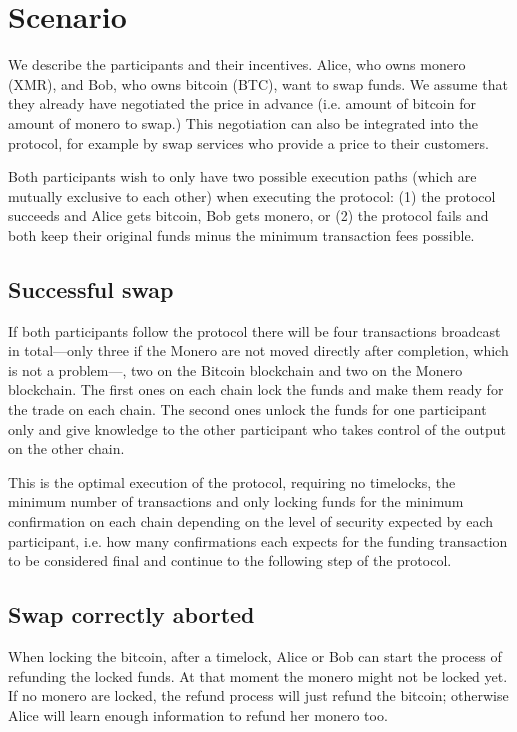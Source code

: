\documentclass{llncs}
\begin{document}
\section{Scenario}
We describe the participants and their incentives. Alice, who owns monero (XMR), and Bob, who owns bitcoin (BTC), want to swap funds. We assume that they already have negotiated the price in advance (i.e. amount of bitcoin for amount of monero to swap.) This negotiation can also be integrated into the protocol, for example by swap services who provide a price to their customers.

Both participants wish to only have two possible execution paths (which are mutually exclusive to each other) when executing the protocol: (1) the protocol succeeds and Alice gets bitcoin, Bob gets monero, or (2) the protocol fails and both keep their original funds minus the minimum transaction fees possible.

\subsection{Successful swap}
If both participants follow the protocol there will be four transactions broadcast in total---only three if the Monero are not moved directly after completion, which is not a problem---, two on the Bitcoin blockchain and two on the Monero blockchain. The first ones on each chain lock the funds and make them ready for the trade on each chain. The second ones unlock the funds for one participant only and give knowledge to the other participant who takes control of the output on the other chain.

This is the optimal execution of the protocol, requiring no timelocks, the minimum number of transactions and only locking funds for the minimum confirmation on each chain depending on the level of security expected by each participant, i.e. how many confirmations each expects for the funding transaction to be considered final and continue to the following step of the protocol.

\subsection{Swap correctly aborted}
When locking the bitcoin, after a timelock, Alice or Bob can start the process of refunding the locked funds. At that moment the monero might not be locked yet. If no monero are locked, the refund process will just refund the bitcoin; otherwise Alice will learn enough information to refund her monero too.
\end{document}
